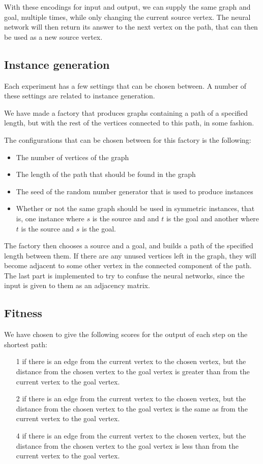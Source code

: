 \newpar With these encodings for input and output, we can supply the same graph and goal, multiple times, while only changing the current source vertex. The neural network will then return its answer to the next vertex on the path, that can then be used as a new source vertex.

\subsection{Instance generation}
Each experiment has a few settings that can be chosen between.
A number of these settings are related to instance generation.

\newpar We have made a factory that produces graphs containing a path of a specified length, but with the rest of the vertices connected to this path, in some fashion.

\newpar The configurations that can be chosen between for this factory is the following:

\begin{itemize}
	\item The number of vertices of the graph
	\item The length of the path that should be found in the graph
	\item The seed of the random number generator that is used to produce instances
	\item Whether or not the same graph should be used in symmetric instances, that is, one instance where $s$ is the source and and $t$ is the goal and another where $t$ is the source and $s$ is the goal.
\end{itemize}

\noindent The factory then chooses a source and a goal, and builds a path of the specified length between them.
If there are any unused vertices left in the graph, they will become adjacent to some other vertex in the connected component of the path.
The last part is implemented to try to confuse the neural networks, since the input is given to them as an adjacency matrix.

\subsection{Fitness}
We have chosen to give the following scores for the output of each step on the shortest path:

\begin{itemize}
	\item[1] if there is an edge from the current vertex to the chosen vertex, but the distance from the chosen vertex to the goal vertex is greater than from the current vertex to the goal vertex.
	\item[2] if there is an edge from the current vertex to the chosen vertex, but the distance from the chosen vertex to the goal vertex is the same as from the current vertex to the goal vertex.
	\item[4] if there is an edge from the current vertex to the chosen vertex, but the distance from the chosen vertex to the goal vertex is less than from the current vertex to the goal vertex.
\end{itemize}

